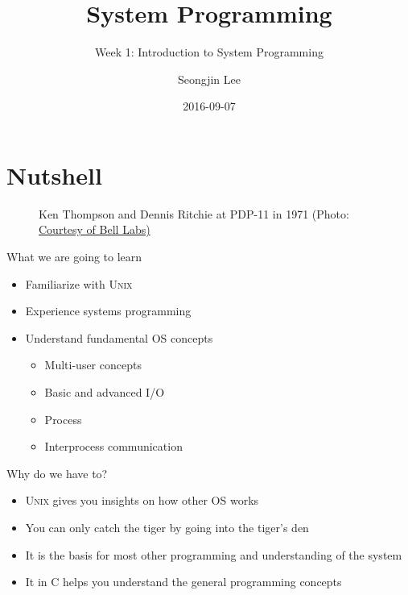 \documentclass[newPxFont,sthlmFooter,nooffset]{beamer}
\title{System Programming}
\subtitle{Week 1: Introduction to System Programming}
\author[SJL]{Seongjin Lee}
\institute{\href{mailto:insight@hanyang.ac.kr}{insight@hanyang.ac.kr}\\\url{http://esos.hanyang.ac.kr}\\Esos Lab. Hanyang University}
\date{2016-09-07}
\begin{document}
\frame[plain]{\titlepage} 



\section{Nutshell} 

\begin{frame}[t]{}
\begin{figure}\centering
   {Ken Thompson and Dennis Ritchie at PDP-11 in 1971 (Photo: \href{https://www.bell-labs.com/usr/dmr/www/kd14.jpg}{Courtesy of Bell Labs)}}
\end{figure}

\end{frame}






\begin{frame}[t]{What we are going to learn}
\begin{itemize}
 \item Familiarize with \textsc{Unix} 
 \item Experience systems programming
 \item Understand fundamental OS concepts
  \begin{itemize}
    \item Multi-user concepts
    \item Basic and advanced I/O
    \item Process
    \item Interprocess communication
  \end{itemize}
\end{itemize}
\end{frame}



\begin{frame}[t]{Why do we have to?}
\begin{itemize}
 \item \textsc{Unix} gives you insights on how other OS works
 \item You can only catch the tiger by going into the tiger's den
 \item It is the basis for most other programming and understanding of the system
 \item It in C helps you understand the general programming concepts
\end{itemize}
\end{frame}
\end{document}
